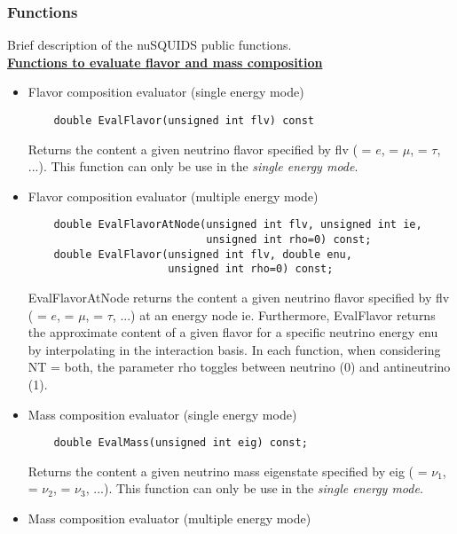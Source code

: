 \subsubsection{Functions}

Brief description of the {\ttfamily nuSQUIDS} public functions.\\

\underline{\textbf{Functions to evaluate flavor and mass composition}}

\begin{itemize}
\item Flavor composition evaluator (single energy mode)
  \begin{lstlisting}
    double EvalFlavor(unsigned int flv) const
  \end{lstlisting}
Returns the content a given neutrino flavor specified by {\ttfamily flv} ({ = $e$}, { = $\mu$}, { = $\tau$}, ...). This function can only be use in the {\it single energy mode}.
\item Flavor composition evaluator (multiple energy mode)
  \begin{lstlisting}
    double EvalFlavorAtNode(unsigned int flv, unsigned int ie, 
                            unsigned int rho=0) const;
    double EvalFlavor(unsigned int flv, double enu,
                      unsigned int rho=0) const;
  \end{lstlisting}
{\ttfamily EvalFlavorAtNode} returns the content a given neutrino flavor specified by {\ttfamily flv} ({ = $e$}, { = $\mu$}, { = $\tau$, ...}) at an energy node {\ttfamily ie}. Furthermore, {\ttfamily EvalFlavor} returns the approximate content of a given flavor for a specific neutrino energy  {\ttf enu} by interpolating in the interaction basis. In each function, when considering  {\ttf  NT = both}, the parameter {\ttf rho} toggles between {\ttf neutrino (0)} and {\ttf antineutrino (1)}.
\item Mass composition evaluator (single energy mode)
  \begin{lstlisting}
    double EvalMass(unsigned int eig) const;
  \end{lstlisting}
Returns the content a given neutrino mass eigenstate specified by {\ttfamily eig} ({ = $\nu_1$}, { = $\nu_2$}, { = $\nu_3$, ...}). This function can only be use in the {\it single energy mode}.
\item Mass composition evaluator (multiple energy mode)
  \begin{lstlisting}

\end{lstlisting}
\end{itemize}
